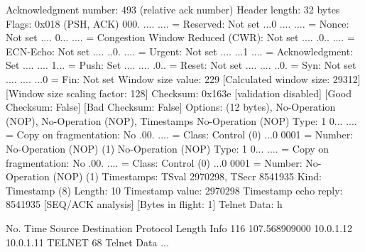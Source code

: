     Acknowledgment number: 493    (relative ack number)
    Header length: 32 bytes
    Flags: 0x018 (PSH, ACK)
        000. .... .... = Reserved: Not set
        ...0 .... .... = Nonce: Not set
        .... 0... .... = Congestion Window Reduced (CWR): Not set
        .... .0.. .... = ECN-Echo: Not set
        .... ..0. .... = Urgent: Not set
        .... ...1 .... = Acknowledgment: Set
        .... .... 1... = Push: Set
        .... .... .0.. = Reset: Not set
        .... .... ..0. = Syn: Not set
        .... .... ...0 = Fin: Not set
    Window size value: 229
    [Calculated window size: 29312]
    [Window size scaling factor: 128]
    Checksum: 0x163e [validation disabled]
        [Good Checksum: False]
        [Bad Checksum: False]
    Options: (12 bytes), No-Operation (NOP), No-Operation (NOP), Timestamps
        No-Operation (NOP)
            Type: 1
                0... .... = Copy on fragmentation: No
                .00. .... = Class: Control (0)
                ...0 0001 = Number: No-Operation (NOP) (1)
        No-Operation (NOP)
            Type: 1
                0... .... = Copy on fragmentation: No
                .00. .... = Class: Control (0)
                ...0 0001 = Number: No-Operation (NOP) (1)
        Timestamps: TSval 2970298, TSecr 8541935
            Kind: Timestamp (8)
            Length: 10
            Timestamp value: 2970298
            Timestamp echo reply: 8541935
    [SEQ/ACK analysis]
        [Bytes in flight: 1]
Telnet
    Data: h

No.     Time           Source                Destination           Protocol Length Info
    116 107.568909000  10.0.1.12             10.0.1.11             TELNET   68     Telnet Data ...

